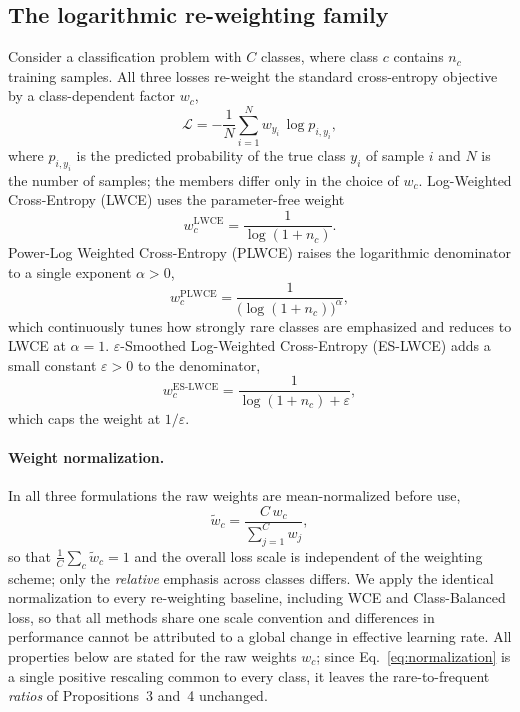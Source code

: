 \documentclass[a4paper,fleqn]{cas-sc}
\begin{document}
\subsection{The logarithmic re-weighting family}
Consider a classification problem with $C$ classes, where class $c$ contains $n_c$
training samples. All three losses re-weight the standard cross-entropy objective
by a class-dependent factor $w_c$,
\begin{equation}\label{eq:weighted-ce}
\mathcal{L} = -\frac{1}{N}\sum_{i=1}^{N} w_{y_i}\,\log p_{i,y_i},
\end{equation}
where $p_{i,y_i}$ is the predicted probability of the true class $y_i$ of sample
$i$ and $N$ is the number of samples; the members differ only in the choice of
$w_c$. Log-Weighted Cross-Entropy (LWCE) uses the parameter-free weight
\begin{equation}\label{eq:lwce}
w_c^{\mathrm{LWCE}} = \frac{1}{\log(1+n_c)}.
\end{equation}
Power-Log Weighted Cross-Entropy (PLWCE) raises the logarithmic denominator to a
single exponent $\alpha>0$,
\begin{equation}\label{eq:plwce}
w_c^{\mathrm{PLWCE}} = \frac{1}{\big(\log(1+n_c)\big)^{\alpha}},
\end{equation}
which continuously tunes how strongly rare classes are emphasized and reduces to
LWCE at $\alpha=1$. $\varepsilon$-Smoothed Log-Weighted Cross-Entropy (ES-LWCE)
adds a small constant $\varepsilon>0$ to the denominator,
\begin{equation}\label{eq:eslwce}
w_c^{\mathrm{ES\text{-}LWCE}} = \frac{1}{\log(1+n_c)+\varepsilon},
\end{equation}
which caps the weight at $1/\varepsilon$.

\paragraph{Weight normalization.}
In all three formulations the raw weights are mean-normalized before use,
\begin{equation}\label{eq:normalization}
\widetilde{w}_c = \frac{C\,w_c}{\sum_{j=1}^{C} w_j},
\end{equation}
so that $\frac{1}{C}\sum_c \widetilde{w}_c = 1$ and the overall loss scale is
independent of the weighting scheme; only the \emph{relative} emphasis across
classes differs. We apply the identical normalization to every re-weighting
baseline, including WCE and Class-Balanced loss, so that all methods share one
scale convention and differences in performance cannot be attributed to a global
change in effective learning rate. All properties below are stated for the raw
weights $w_c$; since Eq.~\eqref{eq:normalization} is a single positive rescaling
common to every class, it leaves the rare-to-frequent \emph{ratios} of
Propositions~3 and~4 unchanged.
\end{document}
